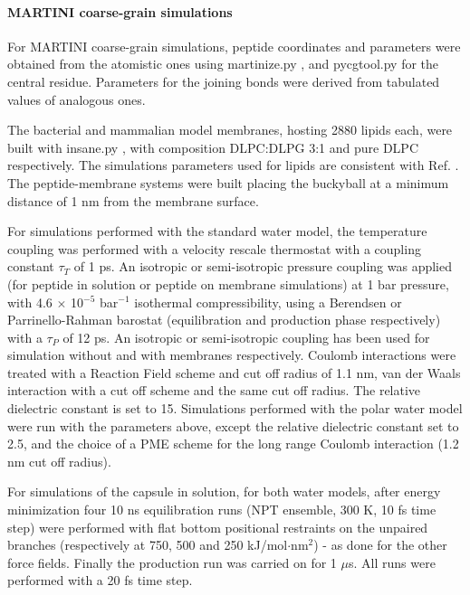 \paragraph{MARTINI coarse-grain simulations}
For MARTINI \cite{Marrink2007, Monticelli2008} coarse-grain simulations, peptide coordinates and parameters were obtained from the atomistic ones using martinize.py \cite{DeJong2013}, and pycgtool.py \cite{Graham2017} for the central residue. Parameters for the joining bonds were derived from tabulated values of analogous ones.

The bacterial and mammalian model membranes, hosting 2880 lipids each, were built with insane.py \cite{Wassenaar2015}, with composition DLPC:DLPG 3:1 and pure DLPC respectively. The simulations parameters used for lipids are consistent with Ref. \cite{SiewertJ.Marrink2003}. The peptide-membrane systems were built placing the buckyball at a minimum distance of 1 nm from the membrane surface.

For simulations performed with the standard water model, the temperature coupling was performed with a velocity rescale thermostat \cite{Bussi2007} with a coupling constant $\tau _T$ of 1 ps. An isotropic or semi-isotropic pressure coupling was applied (for peptide in solution or peptide on membrane simulations) at 1 bar pressure, with 4.6 $\times$ 10$^{-5}$ bar$^{-1}$ isothermal compressibility, using a Berendsen \cite{Berendsen1984} or Parrinello-Rahman barostat \cite{Parrinello1981} (equilibration and production phase respectively) with a $\tau _P$ of 12 ps. An isotropic or semi-isotropic coupling has been used for simulation without and with membranes respectively.
%
Coulomb interactions were treated with a Reaction Field scheme \cite{Tironi1995} and cut off radius of 1.1 nm, van der Waals interaction with a cut off scheme and the same cut off radius. The relative dielectric constant is set to 15.
%
Simulations performed with the polar water model were run with the parameters above, except the relative dielectric constant set to 2.5, and the choice of a PME scheme for the long range Coulomb interaction (1.2 nm cut off radius).

For simulations of the capsule in solution, for both water models, after energy minimization four 10 ns equilibration runs (NPT ensemble, 300 K, 10 fs time step) were performed with flat bottom positional restraints on the unpaired branches (respectively at 750, 500 and 250 kJ/mol$\cdot$nm$^2$) - as done for the other force fields.
%
Finally the production run was carried on for 1 $\mu$s. All runs were performed with a 20 fs time step.

